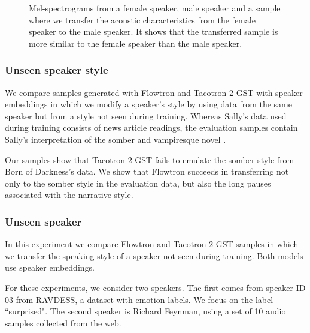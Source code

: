 \documentclass{article}
\begin{document}
\begin{figure}[!ht]
    \centering
    
    
    
    \caption{Mel-spectrograms from a female speaker, male speaker and a sample where we transfer the acoustic characteristics from the female speaker to the male speaker. It shows that the transferred sample is more similar to the female speaker than the male speaker.}
    \label{fig:formants}
\end{figure}

\subsubsection{Unseen speaker style}\label{sec:unseen_data}
We compare samples generated with Flowtron and Tacotron 2 GST with speaker embeddings in which we modify a speaker's style by using data from the same speaker but from a style not seen during training. Whereas Sally's data used during training consists of news article readings, the evaluation samples contain Sally's interpretation of the somber and vampiresque novel .

Our samples show that Tacotron 2 GST fails to emulate the somber style from Born of Darkness's data. We show that Flowtron succeeds in transferring not only to the somber style in the evaluation data, but also the long pauses associated with the narrative style.

\subsubsection{Unseen speaker}\label{sec:unseen_data_and_speaker}
In this experiment we compare Flowtron and Tacotron 2 GST samples in which we transfer the speaking style of a speaker not seen  during training. Both models use speaker embeddings.
 
For these experiments, we consider two speakers. The first comes from speaker ID 03 from RAVDESS, a dataset with emotion labels. We focus on the label ``surprised". The second speaker is Richard Feynman, using a set of 10 audio samples collected from the web. 
\end{document}
